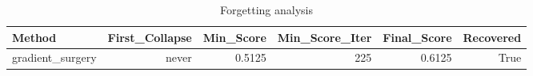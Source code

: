 \begin{table}[htbp]
\centering
\caption{Forgetting analysis}
\label{tab:forgetting}
\begin{tabular}{lrrrrr}
\toprule
\textbf{Method} & \textbf{First\_Collapse} & \textbf{Min\_Score} & \textbf{Min\_Score\_Iter} & \textbf{Final\_Score} & \textbf{Recovered} \\
\midrule
gradient\_surgery & never & 0.5125 & 225 & 0.6125 & True \\
\bottomrule
\end{tabular}
\end{table}